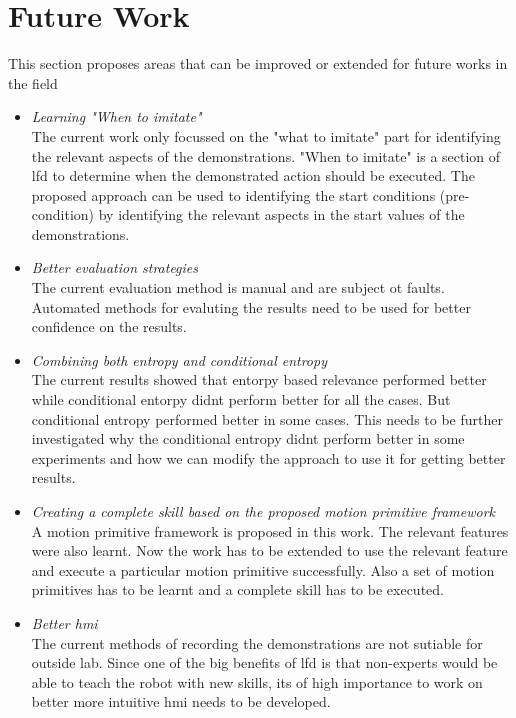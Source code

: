 \section{Future Work}
This section proposes areas that can be improved or extended for future works 
in the field

\begin{itemize}
    \item \textit{Learning "When to imitate" } \\
        The current work only focussed on the "what to imitate" part for identifying
the relevant aspects of the demonstrations. "When to imitate" is a section of 
\acrshort{lfd} to determine when the demonstrated action should be executed.
The proposed approach can be used to identifying the start conditions (pre-condition)
by identifying the relevant aspects in the start values of the demonstrations.

    \item \textit{Better evaluation strategies} \\
        The current evaluation method is manual and are subject ot faults. Automated
methods for evaluting the results need to be used for better confidence on the results.

    \item \textit{Combining both entropy and conditional entropy } \\
The current results showed that entorpy based relevance performed better while
conditional entorpy didnt perform better for all the cases. But conditional entropy 
performed better  in some cases. This needs to be further investigated why the 
conditional entropy didnt perform better in some experiments and how we can modify 
the approach to use it for getting better results.

    \item \textit{Creating a complete skill based on the proposed motion primitive framework}\\
A motion primitive framework is proposed in this work. The relevant features were also 
learnt. Now the work has to be extended to use the relevant feature and execute a particular
motion primitive successfully. Also a set of motion primitives has to be learnt and 
a complete skill has to be executed.

    \item \textit{Better \acrfull{hmi}} \\
The current methods of recording the demonstrations are not sutiable for outside lab.
Since one of the big benefits of \acrshort{lfd} is that non-experts would be able to 
teach the robot with new skills, its of high importance to work on better more intuitive 
\acrshort{hmi} needs to be developed.


\end{itemize}
